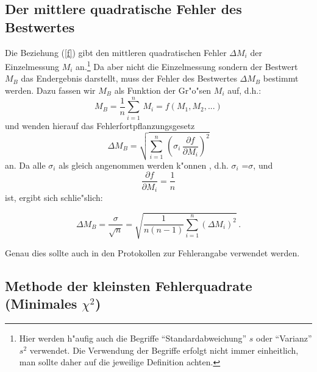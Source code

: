\subsection{Der mittlere quadratische Fehler des Bestwertes}

Die Beziehung (\ref{f}) gibt den mittleren quadratischen Fehler
$\Delta M_{i}$ der Einzelmessung $M_{i}$ an.\footnote{Hier werden
h"aufig auch die Begriffe "`Standardabweichung"' $s$ oder
"`Varianz"' $s^2$ verwendet. Die Verwendung der Begriffe erfolgt
nicht immer einheitlich, man sollte daher auf die jeweilige
Definition achten.} Da aber nicht die Einzelmessung sondern der
Bestwert $M_B$ das Endergebnis darstellt, muss der Fehler des
Bestwertes $\Delta M_{B}$ bestimmt
werden. Dazu fassen wir $M_B$ als Funktion der Gr"o"sen $M_{i}$ auf,
d.h.:
%
\begin{equation} \label{s}
M_{B} = \frac{1}{n} \sum_{i=1}^{n}\,M_{i} = f(M_{1}, M_{2},...)
\end{equation}
%
und wenden hierauf das Fehlerfortpflanzungsgesetz
%
\begin{equation} \label{t}
 \Delta M_{B} = \sqrt{\sum_{i=1}^{n}\,\left(\sigma_{i}\,\frac{\partial
 f}{\partial M_{i}}\right)^{2}}
\end{equation}
%
an. Da alle $\sigma_i$ als gleich angenommen werden k"onnen , d.h.
$\sigma_i$ =$\sigma$, und
%
\begin{equation} \label{u}
 \frac{\partial f}{\partial M_{i}} = \frac{1}{n}
\end{equation}
%
ist, ergibt sich schlie"slich:
%
\begin{important}
\begin{equation} \label{v}
 \Delta M_{B} = \frac{\sigma}{\sqrt{n}}  =
  \sqrt{\frac{1}{n(n-1)} \sum_{i=1}^{n} (\Delta M_{i})^{2}} \, .
\end{equation}
\end{important}
%
Genau dies sollte auch in den Protokollen zur Fehlerangabe
verwendet werden.




\subsection{Methode der kleinsten Fehlerquadrate (Minimales $\chi^2$)}

